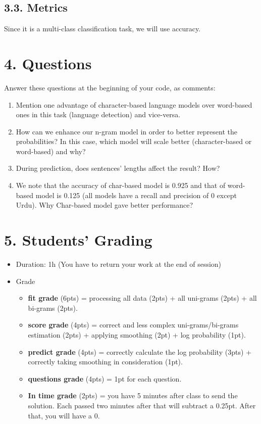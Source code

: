 \documentclass[11pt, a4paper]{article}
\begin{document}
\subsection*{3.3. Metrics}

Since it is a multi-class classification task, we will use accuracy.


\section*{4. Questions}

Answer these questions at the beginning of your code, as comments:
\begin{enumerate}
	\item Mention one advantage of character-based language models over word-based ones in this task (language detection) and vice-versa.
	
	\item How can we enhance our n-gram model in order to better represent the probabilities?
	In this case, which model will scale better (character-based or word-based) and why?
	
	\item During prediction, does sentences' lengths affect the result? How? 
	
	\item We note that the accuracy of char-based model is 0.925 and that of word-based model is 0.125 (all models have a recall and precision of 0 except Urdu). Why Char-based model gave better performance?
	
\end{enumerate}


\section*{5. Students' Grading}

\begin{itemize}
	\item Duration: 1h (You have to return your work at the end of session)
	\item Grade
	\begin{itemize}
		\item \textbf{fit grade} (6pts) = processing all data (2pts) + all uni-grams (2pts) + all bi-grams (2pts).
		\item \textbf{score grade} (4pts) = correct and less complex uni-grams/bi-grams estimation (2pts) + applying smoothing (2pt) + log probability (1pt).
		\item \textbf{predict grade} (4pts) = correctly calculate the log probability (3pts) + correctly taking smoothing in consideration (1pt).
		\item \textbf{questions grade} (4pts) = 1pt for each question.
		\item \textbf{In time grade} (2pts) = you have 5 minutes after class to send the solution. 
		Each passed two minutes after that will subtract a 0.25pt. 
		After that, you will have a 0.
	\end{itemize}
\end{itemize}
\end{document}
